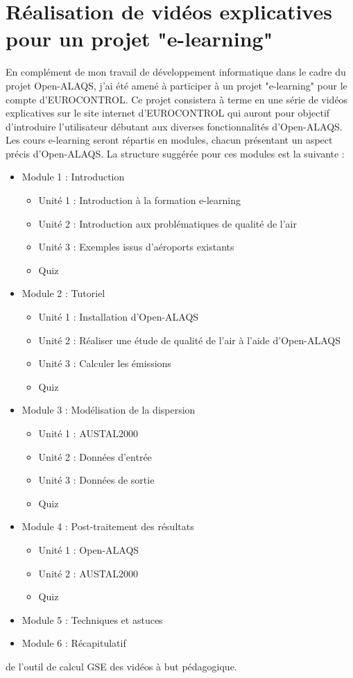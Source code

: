 \documentclass[a4paper,12pt,twoside]{article}
\begin{document}
    \section{Réalisation de vidéos explicatives pour un projet "e-learning"}
    En complément de mon travail de développement informatique dans le cadre du projet \gls{Open-ALAQS}, j'ai été amené à participer à un projet "e-learning" pour le compte d'\gls{EUROCONTROL}. Ce projet consistera à terme en une série de vidéos explicatives sur le site internet d'\gls{EUROCONTROL} qui auront pour objectif d'introduire l'utilisateur débutant aux diverses fonctionnalités d'\gls{Open-ALAQS}.\\
    Les cours e-learning seront répartis en modules, chacun présentant un aspect précis d'\gls{Open-ALAQS}. La structure suggérée pour ces modules est la suivante :
    \begin{itemize}
    	\item Module 1 : Introduction
    	\begin{itemize}
    		\item Unité 1 : Introduction à la formation e-learning
    		\item Unité 2 : Introduction aux problématiques de qualité de l'air
    		\item Unité 3 : Exemples issus d'aéroports existants
    		\item Quiz
    	\end{itemize}
    	\item Module 2 : Tutoriel
    	\begin{itemize}
    		\item Unité 1 : Installation d'\gls{Open-ALAQS}
    		\item Unité 2 : Réaliser une étude de qualité de l'air à l'aide d'\gls{Open-ALAQS}
    		\item Unité 3 : Calculer les émissions
    		\item Quiz
    	\end{itemize}
    	\item Module 3 : Modélisation de la dispersion
    	\begin{itemize}
    		\item Unité 1 : \gls{AUSTAL2000}
    		\item Unité 2 : Données d'entrée
    		\item Unité 3 : Données de sortie
    		\item Quiz
    	\end{itemize}
    	\item Module 4 : Post-traitement des résultats
    	\begin{itemize}
    		\item Unité 1 : \gls{Open-ALAQS}
    		\item Unité 2 : \gls{AUSTAL2000}
    		\item Quiz
    	\end{itemize}
    	\item Module 5 : Techniques et astuces
    	\item Module 6 : Récapitulatif
    \end{itemize}
    de l'outil de calcul \gls{GSE} des vidéos à but pédagogique.
    \newpage
    
\end{document}
